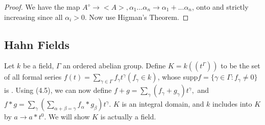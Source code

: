 \begin{proof} %
We have the map $A^\diamond \rightarrow <A>, \alpha_1...\alpha_n \rightarrow \alpha_1+...\alpha_n$, onto and strictly increasing since all $\alpha_i >0$. Now use Higman's Theorem.
\end{proof}

\subsection*{Hahn Fields}

Let $k$ be a field, $\Gamma$ an ordered abelian group. Define $K=k((t^\Gamma))$ to be the set of all formal series $f(t)=\sum_{\gamma \in \Gamma} f_\gamma t^\gamma (f_\gamma \in k)$, whose  supp$f=\{\gamma \in \Gamma: f_\gamma \neq 0\}$ is . Using (4.5), we can now define $f+g=\sum_{\gamma} (f_\gamma + g_\gamma)t^\gamma,$ and $f*g= \sum_{\gamma} (\sum_{\alpha+\beta=\gamma} f_\alpha * g_\beta)t^\gamma$. $K$ is an integral domain, and $k$ includes into $K$ by $a \rightarrow a*t^0$. We will show $K$ is actually a field.
